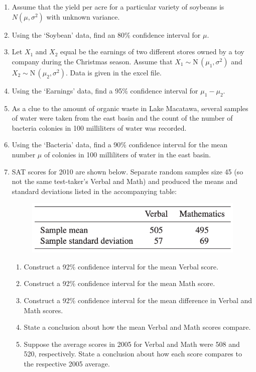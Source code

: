 \documentclass{article}
\newcommand{\follow}[1]{\sim \text{#1}\,}		%
\begin{document}
\begin{enumerate}
    \item Assume that the yield per acre for a particular variety of soybeans is $N(\mu, \sigma^2)$ with unknown variance.
    \item[] Using the `Soybean' data, find an 80\% confidence interval for $\mu$.\bigskip%
    
    \item Let $X_1$ and $X_2$ equal be the earnings of two different stores owned by a toy company during the Christmas season. Assume that $X_1 \follow{N}(\mu_1, \sigma^2)$ and $X_2 \follow{N}(\mu_2, \sigma^2)$. Data is given in the excel file.
    \item[] Using the `Earnings' data, find a 95\% confidence interval for $\mu_1 - \mu_2$.\bigskip%
    
    \item As a clue to the amount of organic waste in Lake Macatawa, several samples of water were taken from the east basin and the count of the number of bacteria colonies in 100 milliliters of water was recorded.
    \item[] Using the `Bacteria' data, find a 90\% confidence interval for the mean number $\mu$ of colonies in 100 milliliters of water in the east basin.\bigskip%
    
    \item SAT scores for 2010 are shown below. Separate random samples size 45 (so not the same test-taker's Verbal and Math) and produced the means and standard deviations listed in the accompanying table:%
    \begin{figure}[H]
        \center\includegraphics[scale=0.5]{images/data-SAT.png}
    \end{figure}
    \begin{enumerate}
        \item Construct a 92\% confidence interval for the mean Verbal score.
        \item Construct a 92\% confidence interval for the mean Math score.
        \item Construct a 92\% confidence interval for the mean difference in Verbal and Math scores.
        \item[] State a conclusion about how the mean Verbal and Math scores compare.
        \item Suppose the average scores in 2005 for Verbal and Math were 508 and 520, respectively. State a conclusion about how each score compares to the respective 2005 average.%
    \end{enumerate}\bigskip
    

\end{enumerate}
\end{document}

